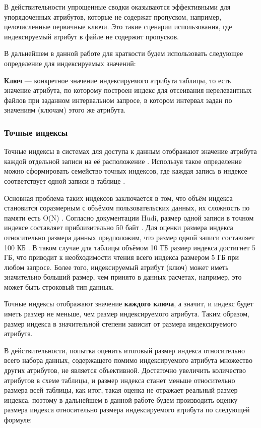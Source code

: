 В действительности упрощенные сводки оказываются эффективными для упорядоченных атрибутов, которые не содержат пропуском, например, целочисленные первичные ключи. Это такие сценарии использования, где индексируемый атрибут в файле не содержит пропусков.

В дальнейшем в данной работе для краткости будем использовать следующее определение для индексируемых значений:
\begin{definition}
    \textbf{Ключ} --- конкретное значение индексируемого атрибута таблицы, то есть значение атрибута, по которому построен индекс для отсеивания нерелевантных файлов при заданном интервальном запросе, в котором интервал задан по значениям (ключам) этого же атрибута.
\end{definition}


\subsubsection{Точные индексы} 

Точные индексы в системах для доступа к данным отображают значение атрибута каждой отдельной записи на её расположение \cite{Hudi_RLI}. Используя такое определение можно сформировать семейство точных индексов, где каждая запись в индексе соответствует одной записи в таблице \cite{Tree_Data_Structures_and_Efficient_Indexing_Techniques}.

Основная проблема таких индексов заключается в том, что объём индекса становится соразмерным с объёмом пользовательских данных, их сложность по памяти есть O(N) \cite{Tree_Data_Structures_and_Efficient_Indexing_Techniques}. Согласно документации Hudi, размер одной записи в точном индексе составляет приблизительно 50 байт \cite{Hudi_RLI}. Для оценки размера индекса относительно размера данных предположим, что размер одной записи составляет 100 КБ \cite{Hudi_RLI}. В таком случае для таблицы объёмом 10 ТБ размер индекса достигнет 5 ГБ, что приводит к необходимости чтения всего индекса размером 5 ГБ при любом запросе. Более того, индексируемый атрибут (ключ) может иметь значительно больший размер, чем принято в данных расчетах, например, это может быть строковый тип данных.

Точные индексы отображают значение \textbf{каждого ключа}, а значит, и индекс будет иметь размер не меньше, чем размер индексируемого атрибута. Таким образом, размер индекса в значительной степени зависит от размера индексируемого атрибута.

В действительности, попытка оценить итоговый размер индекса относительно всего набора данных, содержащего помимо индексируемого атрибута множество других атрибутов, не является объективной. Достаточно увеличить количество атрибутов в схеме таблицы, и размер индекса станет меньше относительно размера всей таблицы, как итог, такая оценка не отражает реальный размер индекса, поэтому в дальнейшем в данной работе будем производить оценку размера индекса относительно размера индексируемого атрибута по следующей формуле:

